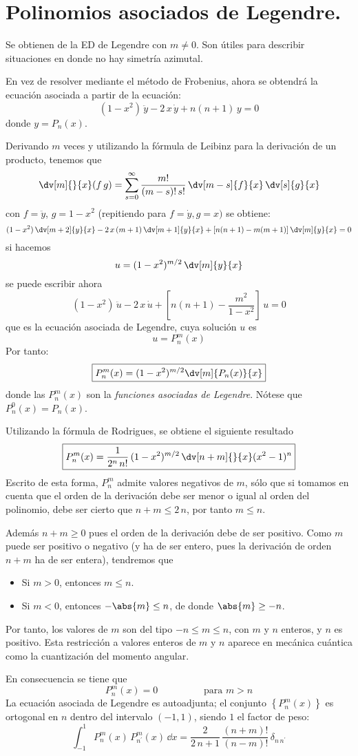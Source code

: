 \section{Polinomios asociados de Legendre.}
Se obtienen de la ED de Legendre con $m \neq 0$. Son útiles para describir situaciones en donde no hay simetría azimutal.
\par
En vez de resolver mediante el método de Frobenius, ahora se obtendrá la ecuación asociada a partir de la ecuación:
\[ (1 - x^{2}) \, \ddot{y} - 2 \, x \, \dot{y} + n(n +1) \, y = 0 \]
donde $y = P_{n} (x)$.
\par
Derivando $m$ veces y utilizando la fórmula de Leibinz para la derivación de un producto, tenemos que
\[ \dv[m]{}{x} (f \, g) = \sum_{s=0}^{\infty} \dfrac{m!}{(m - s)! \, s!} \, \dv[m-s]{f}{x} \, \dv[s]{g}{x} \]
con $f = \ddot{y}$, $g = 1 - x^{2}$ (repitiendo para $f = \dot{y}, g = x)$ se obtiene:
\[ (1 - x^{2}) \, \dv[m+2]{y}{x} - 2 \, x \, (m + 1) \, \dv[m+1]{y}{x} + [n(n+1) - m(m + 1)] \, \dv[m]{y}{x} = 0 \]
si hacemos
\[ u = (1 - x^{2})^{m/2} \, \dv[m]{y}{x} \]
se puede escribir ahora
\[ (1 - x^{2}) \, \ddot{u} - 2 \, x \, \dot{u} + \left[ n(n + 1) - \dfrac{m^{2}}{1 - x^{2}} \right] \, u = 0 \]
que es la ecuación asociada de Legendre, cuya solución $u$ es
\[ u = P_{n}^{m} (x) \]
Por tanto:
\[ \boxed{P_{n}^{m}(x) = (1 - x^{2})^{m/2} \dv[m]{P_{n}(x)}{x} } \]
donde las $P_{n}^{m}(x)$ son la \emph{funciones asociadas de Legendre}. Nótese que $P_{n}^{0}(x) = P_{n}(x)$.
\par
Utilizando la fórmula de Rodrigues, se obtiene el siguiente resultado
\[ \boxed{P_{n}^{m} (x) = \dfrac{1}{2^{n} \, n!} \, (1 - x^{2})^{m/2} \, \dv[n+m]{}{x} (x^{2} - 1)^{n}}\]
Escrito de esta forma, $P_{n}^{m}$ admite valores negativos de $m$, sólo que si tomamos en cuenta que el orden de la derivación debe ser menor o igual al orden del polinomio, debe ser cierto que $n + m \leq 2 \, n$, por tanto $m \leq n$.
\par
Además $n + m \geq 0$ pues el orden de la derivación debe de ser positivo. Como $m$ puede ser positivo o negativo (y ha de ser entero, pues la derivación de orden $n + m$ ha de ser entera), tendremos que
\begin{itemize}
\item Si $m > 0$, entonces $m \leq n$.
\item Si $m < 0$, entonces $- \abs{m} \leq n$, de donde $\abs{m} \geq -n$.
\end{itemize}
Por tanto, los valores de $m$ son del tipo $-n \leq m \leq n$, con $m$ y $n$ enteros, y $n$ es positivo. Esta restricción a valores enteros de $m$ y $n$ aparece en mecánica cuántica como la cuantización del momento angular.
\par
En consecuencia se tiene que
\[ P_{n}^{m} (x) = 0 \hspace{2cm} \mbox{para } m > n\]
La ecuación asociada de Legendre es autoadjunta; el conjunto $ \left\{ P_{n}^{m} (x) \right\}$ es ortogonal en $n$ dentro del intervalo $(-1, 1)$, siendo $1$ el factor de peso:
\[ \boxed{\int_{-1}^{1} P_{n}^{m}(x) \, P_{n^{\prime}}^{m} (x) \, \dd x = \dfrac{2}{2 \,n + 1 } \, \dfrac{(n + m)!}{(n - m)!}  \, \delta_{n \, n^{\prime}} }\]

